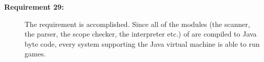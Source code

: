 \begin{description}
\item[\textbf{Requirement 29:}]
The requirement is accomplished. Since all of the modules (the scanner, the parser, the scope checker, the interpreter etc.) of \productname{} are compiled to Java byte code, every system supporting the Java virtual machine is able to run \productname{} games.   
\end{description} 